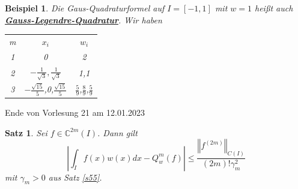 \documentclass{book}
\newtheorem{theorem}[algorithm]{Satz}
\newtheorem{example}[algorithm]{Beispiel}
\def\C{\mathbb{C}}
\begin{document}
            \begin{example}\label{b511}
                Die Gaus-Quadraturformel auf $I=[-1,1]$ mit $w=1$ heißt auch \underline{\textbf{Gauss-Legendre-Quadratur}}. Wir haben 
                \begin{tabular}{|c|c|c|}
                    m & $x_i$ & $w_i$\\
                    1 & 0 & 2\\
                    2 & $-\frac{1}{\sqrt{3}},\frac{1}{\sqrt{3}}$ & 1,1\\
                    3 & $-\frac{\sqrt{15}}{5}$,0,$\frac{\sqrt{15}}{5}$ &$\frac{5}{9}$,$\frac{8}{9}$,$\frac{5}{9}$
                \end{tabular} 
            \end{example}

            \noindent
            \xrfill[0.7ex]{1pt}Ende von Vorlesung 21 am 12.01.2023\xrfill[0.7ex]{1pt}
            
            \begin{theorem}\label{s512}
                Sei $f\in\C^{2m}(I)$. Dann gilt 
                \[\left\vert \int_I f(x)w(x)dx-Q_w^m(f) \right\vert\leq \frac{\left\Vert f^{(2m)} \right\Vert_{C(I)}}{(2m)!\gamma_m^2}\]
                mit $\gamma_m>0$ aus Satz \ref{s55}.
            \end{theorem}
\end{document}
